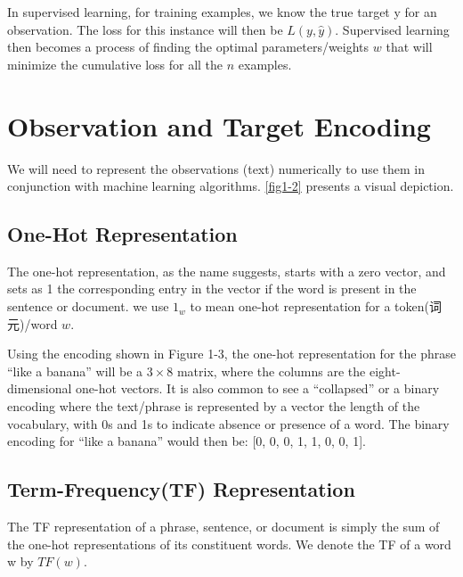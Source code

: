 In supervised learning, for training examples, we know the true target y for an observation. The loss for this instance will then be $L(y, \hat{y})$. Supervised learning then becomes a process of finding the optimal parameters/weights $w$ that will minimize the cumulative loss for all the $n$ examples.

\section{Observation and Target Encoding}
We will need to represent the observations (text) numerically to use them in conjunction with machine learning algorithms. \autoref{fig1-2} presents a visual depiction.

\subsection{One-Hot Representation}

The one-hot representation, as the name suggests, starts with a zero vector, and sets as
1 the corresponding entry in the vector if the word is present in the sentence or document. we use $1_w$ to mean one-hot representation for a token(词元)/word $w$.

Using the encoding shown in Figure 1-3, the one-hot representation for the phrase “like a banana”
will be a $3\times 8$ matrix, where the columns are the eight-dimensional one-hot vectors. It
is also common to see a “collapsed” or a binary encoding where the text/phrase is
represented by a vector the length of the vocabulary, with 0s and 1s to indicate
absence or presence of a word. The binary encoding for “like a banana” would then
be: [0, 0, 0, 1, 1, 0, 0, 1].


\subsection{Term-Frequency(TF) Representation}
The TF representation of a phrase, sentence, or document is simply the sum of the
one-hot representations of its constituent words. We denote the TF of a word w by $TF(w)$.

